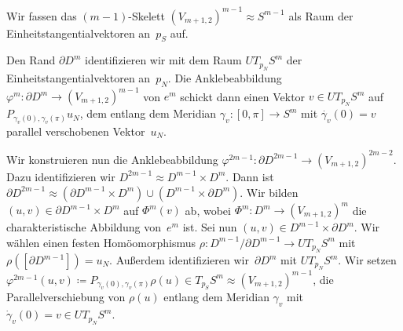 \documentclass[11pt, a4paper, german]{article}
\theoremstyle{definition}
\theoremstyle{remark}
\newcommand{\R}{\mathbb{R}} %
\newcommand{\V}[2]{V_{{#2},{#1}}} %
\newcommand{\homeo}{\approx} %
\begin{document}
Wir fassen das $(m-1)$-Skelett $(\V{2}{m+1})^{m-1} \homeo S^{m-1}$ als Raum der Einheitstangentialvektoren an~$p_S$ auf.

Den Rand $\partial D^m$ identifizieren wir mit dem Raum $UT_{p_N} S^m$ der Einheitstangentialvektoren an~$p_N$.
Die Anklebeabbildung $\varphi^m : \partial D^m \to (\V{2}{m+1})^{m-1}$ von $e^m$ schickt dann einen Vektor $v \in UT_{p_N} S^m$ auf $P_{\gamma_v(0),\gamma_v(\pi)} u_N$, dem entlang dem Meridian $\gamma_v : [0, \pi] \to S^m$ mit $\dot{\gamma_v}(0) = v$ parallel verschobenen Vektor~$u_N$.

Wir konstruieren nun die Anklebeabbildung $\varphi^{2m-1} : \partial D^{2m-1} \to (\V{2}{m+1})^{2m-2}$.
Dazu identifizieren wir $D^{2m-1} \homeo D^{m-1} \times D^m$.
Dann ist $\partial D^{2m-1} \homeo (\partial D^{m-1} \times D^m) \cup (D^{m-1} \times \partial D^m)$.
Wir bilden $(u, v) \in \partial D^{m-1} \times D^m$ auf $\Phi^m(v)$ ab, wobei $\Phi^m : D^m \to (\V{2}{m+1})^m$ die charakteristische Abbildung von~$e^m$ ist.
Sei nun $(u, v) \in D^{m-1} \times \partial D^m$.
Wir wählen einen festen Homöomorphismus $\rho : D^{m-1} / \partial D^{m-1} \to UT_{p_N} S^m$ mit $\rho([\partial D^{m-1}]) = u_N$.
Außerdem identifizieren wir~$\partial D^m$ mit $UT_{p_N} S^m$.
Wir setzen $\varphi^{2m-1}(u, v) \coloneqq P_{\gamma_v(0),\gamma_v(\pi)} \rho(u) \in T_{p_S} S^m \homeo (\V{2}{m+1})^{m-1}$, die Parallelverschiebung von $\rho(u)$ entlang dem Meridian $\gamma_v$ mit $\dot{\gamma}_v(0) = v \in UT_{p_N} S^m$.
\end{document}
